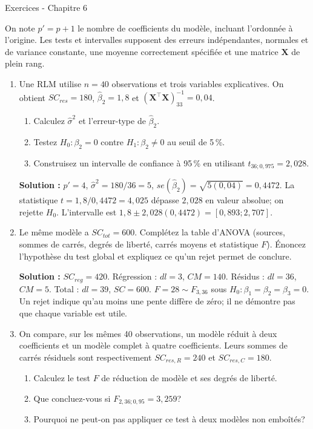 \documentclass[letterpaper,11pt]{article}
\newcommand{\bo}[1]{\bm{#1}}
\newcommand{\prof}[1]{\ifdefined\avecsolutions\par{\color{blue}\textbf{Solution :} #1}\par\fi}
\begin{document}
\begin{center}{\Large Exercices - Chapitre 6}\end{center}
On note $p'=p+1$ le nombre de coefficients du modèle, incluant l'ordonnée à l'origine. Les tests et intervalles supposent des erreurs indépendantes, normales et de variance constante, une moyenne correctement spécifiée et une matrice $\bo X$ de plein rang.
\begin{enumerate}[leftmargin=*,wide,label=\bfseries Exercice \arabic*:]
\item Une RLM utilise $n=40$ observations et trois variables explicatives. On obtient $SC_{res}=180$, $\hat\beta_2=1{,}8$ et $(\bo X^\top\bo X)^{-1}_{33}=0{,}04$.
\begin{enumerate}[label=\alph*)]
\item Calculez $\hat\sigma^2$ et l'erreur-type de $\hat\beta_2$.
\item Testez $H_0:\beta_2=0$ contre $H_1:\beta_2\ne0$ au seuil de 5\,\%.
\item Construisez un intervalle de confiance à 95\,\% en utilisant $t_{36;0{,}975}=2{,}028$.
\end{enumerate}
\prof{$p'=4$, $\hat\sigma^2=180/36=5$, $se(\hat\beta_2)=\sqrt{5(0{,}04)}=0{,}4472$. La statistique $t=1{,}8/0{,}4472=4{,}025$ dépasse $2{,}028$ en valeur absolue; on rejette $H_0$. L'intervalle est $1{,}8\pm2{,}028(0{,}4472)=[0{,}893;2{,}707]$.}
\item Le même modèle a $SC_{tot}=600$. Complétez la table d'ANOVA (sources, sommes de carrés, degrés de liberté, carrés moyens et statistique $F$). Énoncez l'hypothèse du test global et expliquez ce qu'un rejet permet de conclure.
\prof{$SC_{reg}=420$. Régression : $dl=3$, $CM=140$. Résidus : $dl=36$, $CM=5$. Total : $dl=39$, $SC=600$. $F=28\sim F_{3,36}$ sous $H_0:\beta_1=\beta_2=\beta_3=0$. Un rejet indique qu'au moins une pente diffère de zéro; il ne démontre pas que chaque variable est utile.}
\item On compare, sur les mêmes 40 observations, un modèle réduit à deux coefficients et un modèle complet à quatre coefficients. Leurs sommes de carrés résiduels sont respectivement $SC_{res,R}=240$ et $SC_{res,C}=180$.
\begin{enumerate}[label=\alph*)]
\item Calculez le test $F$ de réduction de modèle et ses degrés de liberté.
\item Que concluez-vous si $F_{2,36;0{,}95}=3{,}259$?
\item Pourquoi ne peut-on pas appliquer ce test à deux modèles non emboîtés?

\end{enumerate}
\end{enumerate}
\end{document}
